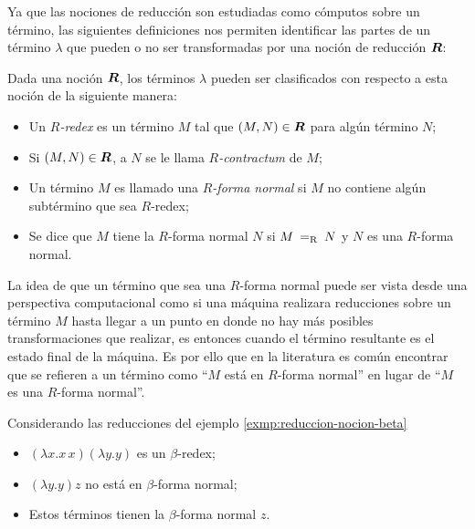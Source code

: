 Ya que las nociones de reducción son estudiadas como cómputos sobre un término, las siguientes definiciones nos permiten identificar las partes de un término \( λ \) que pueden o no ser transformadas por una noción de reducción \( \boldsymbol{R} \):

\begin{defn}
  Dada una noción \( \boldsymbol{R} \), los términos \( λ \) pueden ser clasificados con respecto a esta noción de la siguiente manera:
  \begin{itemize}
  \item Un \( R \)\emph{-redex} es un término \( M \) tal que \( (M,N)\in \boldsymbol{R} \) para algún término \( N \);
  \item Si \( (M,N)\in \boldsymbol{R} \), a \( N \) se le llama \( R \)\emph{-contractum} de \( M \);
  \item Un término \( M \) es llamado una \( R \)\emph{-forma normal} si \( M \) no contiene algún subtérmino que sea \( R \)-redex;
  \item Se dice que \( M \) tiene la \( R \)-forma normal \( N \) si \( M \ \operatorname{=_{R}}\  N \) y \( N \) es una \( R \)-forma normal.
  \end{itemize}
\end{defn}

La idea de que un término que sea una \( R \)-forma normal puede ser vista desde una perspectiva computacional como si una máquina realizara reducciones sobre un término \( M \) hasta llegar a un punto en donde no hay más posibles transformaciones que realizar, es entonces cuando el término resultante es el estado final de la máquina. Es por ello que en la literatura es común encontrar que se refieren a un término como ``\( M \) está en \( R \)-forma normal'' en lugar de ``\( M \) es una \( R \)-forma normal''.

\begin{exmp} \label{exmp:clasificacion-nocion-beta}
  Considerando las reducciones del ejemplo \ref{exmp:reduccion-nocion-beta}
  \begin{itemize}
  \item \( (λx.x\, x)(λy.y) \) es un \( β \)-redex;
  \item \( (λy.y)z \) no está en \( β \)-forma normal;
  \item Estos términos tienen la \( β \)-forma normal \( z \).
  \end{itemize}
\end{exmp}

